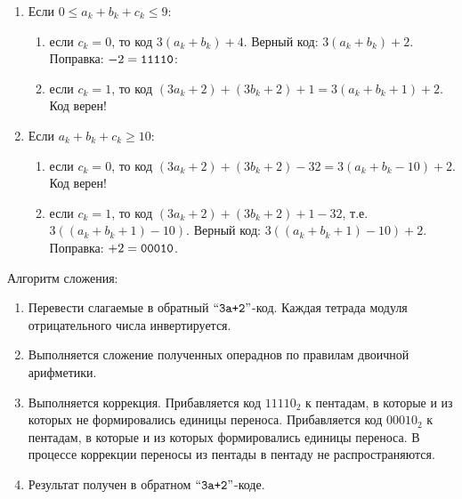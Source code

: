 \begin{enumerate}
    \item Если $0\leq a_{k}+b_{k}+c_{k}\leq 9$:
    \begin{enumerate}
        \item если $c_{k}=0$, то код $3(a_{k}+b_{k}) + 4$. Верный код: $3(a_{k}+b_{k})+2$. Поправка: $-2=\texttt{11110}$:
        \item если $c_{k}=1$, то код $(3a_k+2)+(3b_{k}+2)+1=3(a_{k}+b_{k}+1)+2$. Код верен!
    \end{enumerate}

    \item Если $a_{k}+b_{k}+c_{k}\geq 10$:
    \begin{enumerate}
        \item если $c_{k}=0$, то код $(3a_{k}+2)+(3b_{k}+2)-32=3(a_{k}+ b_{k}-10)+2$. Код верен!
        \item если $c_{k}=1$, то код $(3a_{k}+2)+(3b_{k}+2)+1-32$, т.е. $3((a_{k}+b_{k}+1)-10)$. Верный код:
        $3((a_{k}+b_{k}+1)-10)+2$. Поправка: $+2=\texttt{00010}$.
    \end{enumerate}
\end{enumerate}

Алгоритм сложения:

\begin{enumerate}
    \item Перевести слагаемые в обратный $\text{``\texttt{3a+2}''}$-код. Каждая тетрада модуля отрицательного числа инвертируется.
    \item Выполняется сложение полученных операднов по правилам двоичной арифметики.
    \item Выполняется коррекция. Прибавляется код $11110_{2}$ к пентадам, в которые и из которых не формировались единицы переноса. Прибавляется код $00010_{2}$ к пентадам, в которые и из которых формировались единицы переноса. В процессе коррекции переносы из пентады в пентаду не распространяются.
    \item Результат получен в обратном $\text{``\texttt{3a+2}''}$-коде.
\end{enumerate}

